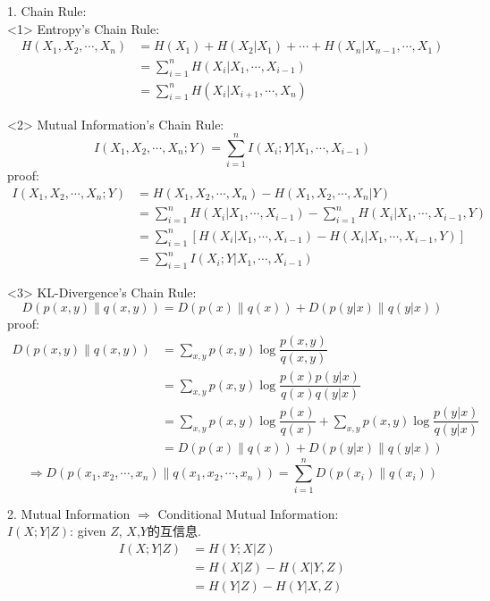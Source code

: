\begin{proposition}
1. Chain Rule:\\
<1> Entropy's Chain Rule:
\begin{align*}
H(X_1,X_2,\cdots,X_n) &= H(X_1) + H(X_2|X_1) + \cdots + H(X_n|X_{n-1},\cdots,X_1) \\
&= \sum_{i=1}^{n}H(X_i|X_1,\cdots,X_{i-1}) \\
&= \sum_{i=1}^{n}H(X_i|X_{i+1},\cdots,X_{n})
\end{align*}

<2> Mutual Information's Chain Rule:
$$I(X_1,X_2,\cdots,X_n;Y)=\sum_{i=1}^{n}I(X_i;Y|X_1,\cdots,X_{i-1})$$
proof:
\begin{align*}
I(X_1,X_2,\cdots,X_n;Y) &= H(X_1,X_2,\cdots,X_n) - H(X_1,X_2,\cdots,X_n|Y) \\
&= \sum_{i=1}^{n}H(X_i|X_1,\cdots,X_{i-1}) - \sum_{i=1}^{n}H(X_i|X_1,\cdots,X_{i-1},Y) \\
&= \sum_{i=1}^{n}\left[H(X_i|X_1,\cdots,X_{i-1})-H(X_i|X_1,\cdots,X_{i-1},Y)\right] \\
&= \sum_{i=1}^{n}I(X_i;Y|X_1,\cdots,X_{i-1})
\end{align*}

<3> KL-Divergence's Chain Rule:
$$D\left(p(x,y)\|q(x,y)\right)=D\left(p(x)\|q(x)\right) + D\left(p(y|x)\|q(y|x)\right)$$
proof:
\begin{align*}
D\left(p(x,y)\|q(x,y)\right) &= \sum_{x,y}p(x,y)\log\dfrac{p(x,y)}{q(x,y)} \\
&= \sum_{x,y}p(x,y)\log\dfrac{p(x)p(y|x)}{q(x)q(y|x)} \\
&= \sum_{x,y}p(x,y)\log\dfrac{p(x)}{q(x)} + \sum_{x,y}p(x,y)\log\dfrac{p(y|x)}{q(y|x)} \\
&= D\left(p(x)\|q(x)\right) + D\left(p(y|x)\|q(y|x)\right)
\end{align*}
$$\Rightarrow D\left(p(x_1,x_2,\cdots,x_n)\|q(x_1,x_2,\cdots,x_n)\right)=\sum_{i=1}^{n}D\left(p(x_i)\|q(x_i)\right)$$


2. Mutual Information $\Rightarrow$ Conditional Mutual Information:\\
$I(X;Y|Z)$: given $Z$, $X$,$Y$的互信息.
\begin{align*}
    I(X;Y|Z) &= H(Y;X|Z) \\
    &= H(X|Z) - H(X|Y,Z) \\
    &= H(Y|Z) - H(Y|X,Z)
\end{align*}
\end{proposition}

